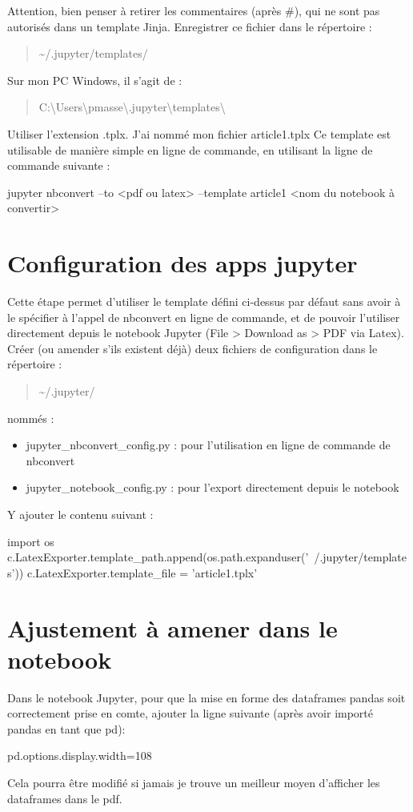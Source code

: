 \documentclass{article}
\begin{document}
Attention, bien penser à retirer les commentaires (après \#), qui ne sont pas autorisés dans un template Jinja.
Enregistrer ce fichier dans le répertoire :
\begin{quote}\textasciitilde/.jupyter/templates/\end{quote}

Sur mon PC Windows, il s'agit de :
\begin{quote}C:\textbackslash Users\textbackslash pmasse\textbackslash .jupyter\textbackslash templates\textbackslash\end{quote}
Utiliser l'extension \og .tplx. 
J'ai nommé mon fichier \og article1.tplx \fg
Ce template est utilisable de manière simple en ligne de commande, en utilisant la ligne de commande suivante : 
\footnotesize
\begin{verbatimtab}
jupyter nbconvert --to <pdf ou latex> --template article1 <nom du notebook à convertir>
\end{verbatimtab}
\normalsize

\section{Configuration des apps jupyter}

Cette étape permet d'utiliser le template défini ci-dessus par défaut sans avoir à le spécifier à l'appel de nbconvert en ligne de commande, et de pouvoir l'utiliser directement depuis le notebook Jupyter (File > Download as > PDF via Latex).
Créer (ou amender s'ils existent déjà) deux fichiers de configuration dans le répertoire :
\begin{quote}\textasciitilde/.jupyter/\end{quote}
nommés : 
\begin{itemize}
    \item jupyter\_nbconvert\_config.py : pour l'utilisation en ligne de commande de nbconvert
    \item jupyter\_notebook\_config.py : pour l'export directement depuis le notebook
\end{itemize}
Y ajouter le contenu suivant :
\footnotesize
\begin{verbatimtab}
import os
c.LatexExporter.template_path.append(os.path.expanduser('~/.jupyter/templates'))
c.LatexExporter.template_file = 'article1.tplx'
\end{verbatimtab}
\normalsize

\section{Ajustement à amener dans le notebook}

Dans le notebook Jupyter, pour que la mise en forme des dataframes pandas soit correctement prise en comte, ajouter la ligne suivante (après avoir importé pandas en tant que pd):
\begin{verbatimtab}
pd.options.display.width=108
\end{verbatimtab}
Cela pourra être modifié si jamais je trouve un meilleur moyen d'afficher les dataframes dans le pdf.
\end{document}
